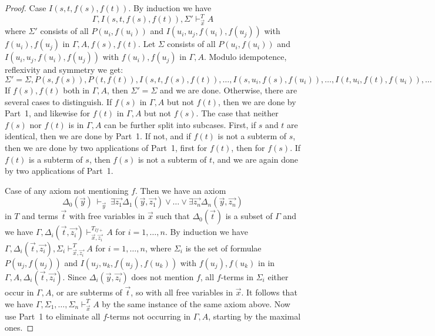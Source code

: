 \documentclass[10pt,a4paper]{article}
\begin{document}
\begin{proof}
Case $I(s,t,f(s),f(t))$. By induction we have 
\begin{equation}\label{ih:Istfsft}
\Gamma,I(s,t,f(s),f(t)),\Sigma'\vdash_{\vec{x}}^{T} A
\end{equation}
where $\Sigma'$ consists of all $P(u_i,f(u_i))$ and $I(u_i,u_j,f(u_i),f(u_j))$
with $f(u_i),f(u_j)$ in $\Gamma,A,f(s),f(t)$. 
Let $\Sigma$ consists of all $P(u_i,f(u_i))$ and $I(u_i,u_j,f(u_i),f(u_j))$
with $f(u_i),f(u_j)$ in $\Gamma,A$.
Modulo idempotence, reflexivity and symmetry we get:
\begin{equation}\label{eq:sigmas}
\Sigma' = \Sigma,P(s,f(s)),P(t,f(t)),I(s,t,f(s),f(t)),\ldots,I(s,u_i,f(s),f(u_i)),\ldots,I(t,u_i,f(t),f(u_i)),\ldots
\end{equation}
If $f(s),f(t)$ both in $\Gamma,A$,
then $\Sigma'=\Sigma$ and we are done. Otherwise, there are several cases
to distinguish. If $f(s)$ in $\Gamma,A$ but not $f(t)$, then we are done by Part~1,
and likewise for $f(t)$ in $\Gamma,A$ but not $f(s)$. The case that neither
$f(s)$ nor $f(t)$ is in $\Gamma,A$ can be further split into subcases. First, if $s$ and $t$
are identical, then we are done by Part~1. If not, and if $f(t)$ is not a subterm of $s$,
then we are done by two applications of Part~1, first for $f(t)$, then for $f(s)$.
If $f(t)$ is a subterm of $s$, then $f(s)$ is not a subterm of $t$, and we are 
again done by two applications of Part~1.

Case of any axiom not mentioning $f$. Then we have an axiom
$$
\Delta_0(\vec{y})~\vdash_{\vec{y}}~
\exists \vec{z_1}\Delta_1(\vec{y},\vec{z_1})\vee\dots\vee\exists \vec{z_n}\Delta_n(\vec{y},\vec{z_n})
$$
in $T$ and terms $\vec{t}$ with free variables in $\vec{x}$ such
that $\Delta_0(\vec{t})$ is a subset of $\Gamma$ and we have
$\Gamma,\Delta_i(\vec{t},\vec{z_i})\vdash_{\vec{x},\vec{z_i}}^{T_{I\!f{+}}} A$ 
for $i=1,\dots,n$.
By induction we have $\Gamma,\Delta_i(\vec{t},\vec{z_i}), \Sigma_i\vdash_{\vec{x},\vec{z_i}}^{T} A$
for $i = 1,\dots,n$, where $\Sigma_i$ is the set of formulae $P(u_j,f(u_j))$ and $I(u_j,u_k,f(u_j),f(u_k))$
with $f(u_j),f(u_k)$ in in $\Gamma,A,\Delta_i(\vec{t},\vec{z_i})$.
Since $\Delta_i(\vec{y},\vec{z_i})$ does not mention $f$, all $f$-terms in
$\Sigma_i$  either occur in $\Gamma,A$, or are subterms of $\vec{t}$, so with
all free variables in $\vec{x}$. It follows that we have
$\Gamma,\Sigma_1,\dots,\Sigma_n\vdash_{\vec{x}}^{T} A$
by the same instance of the same axiom above. Now use Part~1 to eliminate
all $f$-terms not occurring in $\Gamma,A$, starting by the maximal ones.
\end{proof}
\end{document}

